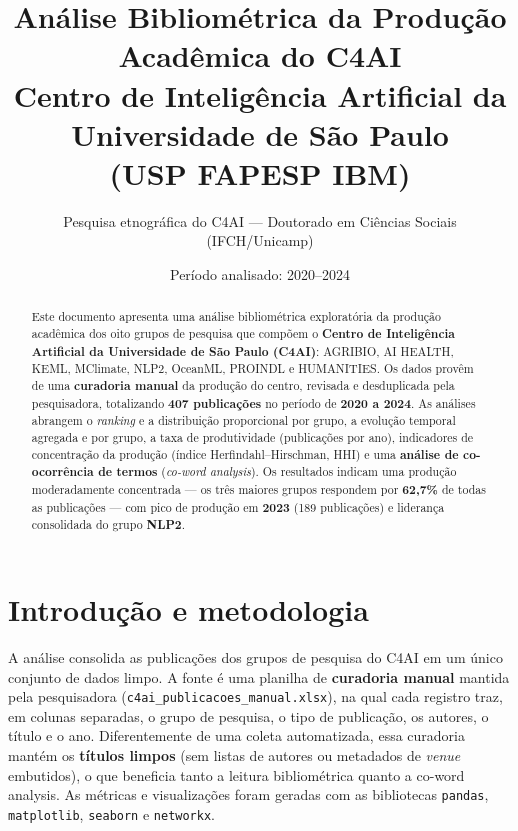 \documentclass[12pt,a4paper]{article}
\title{\textbf{Análise Bibliométrica da Produção Acadêmica do C4AI}\\[0.3em]
       \large Centro de Inteligência Artificial da Universidade de São Paulo\\
       \normalsize (USP \textbullet{} FAPESP \textbullet{} IBM)}
\author{Pesquisa etnográfica do C4AI --- Doutorado em Ciências Sociais (IFCH/Unicamp)}
\date{Período analisado: 2020--2024}
\begin{document}
\maketitle

\begin{abstract}
\noindent
Este documento apresenta uma análise bibliométrica exploratória da produção
acadêmica dos oito grupos de pesquisa que compõem o \textbf{Centro de
Inteligência Artificial da Universidade de São Paulo (C4AI)}: AGRIBIO, AI
HEALTH, KEML, MClimate, NLP2, OceanML, PROINDL e HUMANITIES. Os dados provêm de
uma \textbf{curadoria manual} da produção do centro, revisada e desduplicada
pela pesquisadora, totalizando \textbf{407 publicações} no período de
\textbf{2020 a 2024}. As análises
abrangem o \emph{ranking} e a distribuição proporcional por grupo, a evolução
temporal agregada e por grupo, a taxa de produtividade (publicações por ano),
indicadores de concentração da produção (índice Herfindahl--Hirschman, HHI) e
uma \textbf{análise de co-ocorrência de termos} (\emph{co-word analysis}). Os
resultados indicam uma produção moderadamente concentrada --- os três maiores
grupos respondem por \textbf{62{,}7\%} de todas as publicações --- com pico de
produção em \textbf{2023} (\num{189} publicações) e liderança consolidada do
grupo \textbf{NLP2}.
\end{abstract}

\tableofcontents
\bigskip

\section{Introdução e metodologia}

A análise consolida as publicações dos grupos de pesquisa do C4AI em um único
conjunto de dados limpo. A fonte é uma planilha de \textbf{curadoria manual}
mantida pela pesquisadora (\texttt{c4ai\_publicacoes\_manual.xlsx}), na qual cada
registro traz, em colunas separadas, o grupo de pesquisa, o tipo de publicação,
os autores, o título e o ano. Diferentemente de uma coleta automatizada, essa
curadoria mantém os \textbf{títulos limpos} (sem listas de autores ou metadados
de \emph{venue} embutidos), o que beneficia tanto a leitura bibliométrica quanto
a co-word analysis. As métricas e visualizações foram geradas com as bibliotecas
\texttt{pandas}, \texttt{matplotlib}, \texttt{seaborn} e \texttt{networkx}.
\end{document}
